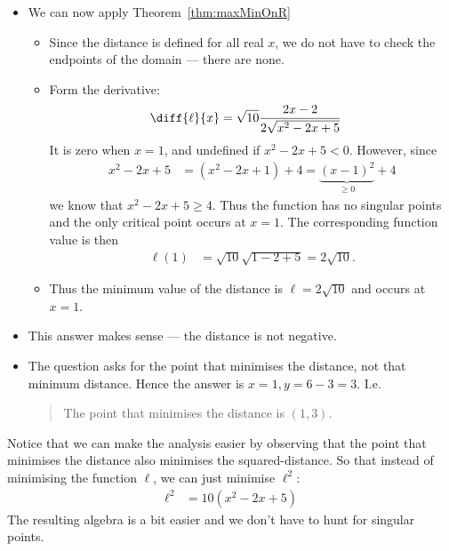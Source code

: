 \begin{eg}
\begin{itemize}
\item We can now apply Theorem~\ref{thm:maxMinOnR}
\begin{itemize}
 \item Since the distance is defined for all real $x$, we do not have to check the
endpoints of the domain --- there are none.
\item Form the derivative:
\begin{align*}
  \diff{\ell}{x} &= \sqrt{10} \frac{2x-2}{2\sqrt{x^2-2x+5}}
\end{align*}
It is zero when $x=1$, and undefined if $x^2-2x+5<0$. However, since
\begin{align*}
  x^2-2x+5 &= (x^2-2x+1)+4 = \underbrace{(x-1)^2}_{\geq0}+4
\end{align*}
we know that $x^2-2x+5 \geq 4$. Thus the function has no singular points and the only
critical point occurs at $x=1$. The corresponding function value is then
\begin{align*}
  \ell(1) &=\sqrt{10} \sqrt{1-2+5} = 2 \sqrt{10}.
\end{align*}
\item Thus the minimum value of the distance is $\ell=2 \sqrt{10}$ and occurs at $x=1$.
\end{itemize}
\item This answer makes sense --- the distance is not negative.
\item The question asks for the point that minimises the distance, not that minimum
distance. Hence the answer is $x=1, y=6-3 = 3$. I.e.
\begin{quote}
 The point that minimises the distance is $(1,3)$.
\end{quote}
\end{itemize}

Notice that we can make the analysis easier by observing that the point that minimises
the distance also minimises the squared-distance. So that instead of minimising the
function $\ell$, we can just minimise $\ell^2$:
\begin{align*}
  \ell^2 &= 10(x^2-2x+5)
\end{align*}
The resulting algebra is a bit easier and we don't have to hunt for singular points.

\end{eg}

